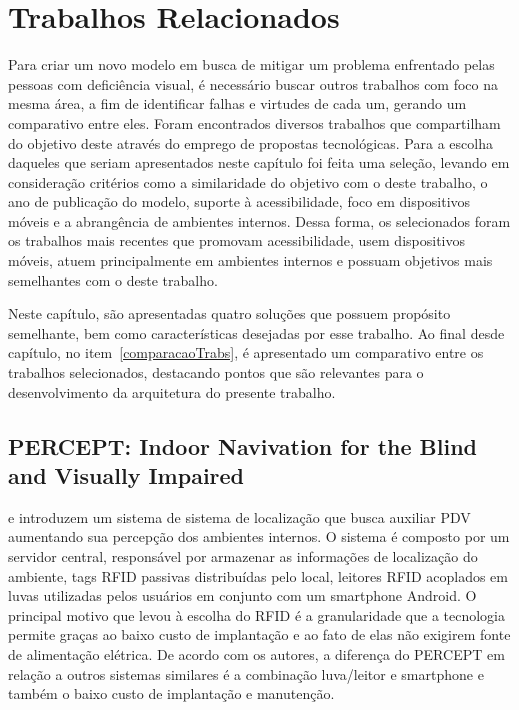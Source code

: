 \documentclass[english,brazilian]{UNISINOSmonografia}
\begin{document}
\chapter{Trabalhos Relacionados}\label{cap:trabalhosRelacionados}

Para criar um novo modelo em busca de mitigar um problema enfrentado pelas pessoas com deficiência visual, é necessário buscar outros trabalhos com foco na mesma área, a fim de identificar falhas e virtudes de cada um, gerando um comparativo entre eles. Foram encontrados diversos trabalhos que compartilham do objetivo deste através do emprego de propostas tecnológicas. Para a escolha daqueles que seriam apresentados neste capítulo foi feita uma seleção, levando em consideração critérios como a similaridade do objetivo com o deste trabalho, o ano de publicação do modelo, suporte à acessibilidade, foco em dispositivos móveis e a abrangência de ambientes internos. Dessa forma, os selecionados foram os trabalhos mais recentes que promovam acessibilidade, usem dispositivos móveis, atuem principalmente em ambientes internos e possuam objetivos mais semelhantes com o deste trabalho.

Neste capítulo, são apresentadas quatro soluções que possuem propósito semelhante, bem como características desejadas por esse trabalho. Ao final desde capítulo, no item~\ref{comparacaoTrabs}, é apresentado um comparativo entre os trabalhos selecionados, destacando pontos que são relevantes para o desenvolvimento da arquitetura do presente trabalho.

	\section{PERCEPT: Indoor Navivation for the Blind and Visually Impaired} 
 e  introduzem um sistema de sistema de localização que busca auxiliar PDV aumentando sua percepção dos ambientes internos. O sistema é composto por um servidor central, responsável por armazenar as informações de localização do ambiente, tags RFID passivas distribuídas pelo local, leitores RFID acoplados em luvas utilizadas pelos usuários em conjunto com um smartphone Android. O principal motivo que levou à escolha do RFID é a granularidade que a tecnologia permite graças ao baixo custo de implantação e ao fato de elas não exigirem fonte de alimentação elétrica. De acordo com os autores, a diferença do PERCEPT em relação a outros sistemas similares é a combinação luva/leitor e smartphone e também o baixo custo de implantação e manutenção. 
\end{document}
